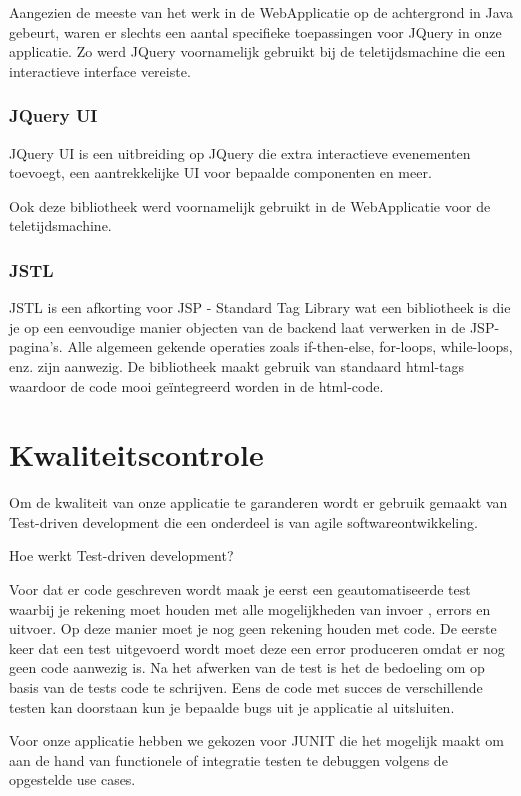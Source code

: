 \documentclass[pdftex,a4paper,12pt,twoside]{report}
\begin{document}
Aangezien de meeste van het werk in de WebApplicatie op de achtergrond in Java gebeurt, waren er slechts een aantal specifieke toepassingen voor JQuery in onze applicatie. Zo werd JQuery voornamelijk gebruikt bij de teletijdsmachine die een interactieve interface vereiste.


\subsection{JQuery UI}
JQuery UI is een uitbreiding op JQuery die extra interactieve evenementen toevoegt, een aantrekkelijke UI voor bepaalde componenten en meer.

Ook deze bibliotheek werd voornamelijk gebruikt in de WebApplicatie voor de teletijdsmachine.


\subsection{JSTL}
JSTL is een afkorting voor JSP - Standard Tag Library wat een bibliotheek is die je op een eenvoudige manier objecten van de backend laat verwerken in de JSP-pagina's. Alle algemeen gekende operaties zoals if-then-else, for-loops, while-loops, enz. zijn aanwezig. De bibliotheek maakt gebruik van standaard html-tags waardoor de code mooi geïntegreerd worden in de html-code.

 
 \chapter{Kwaliteitscontrole}
 

Om de kwaliteit van onze applicatie te garanderen wordt er gebruik gemaakt van Test-driven development die een onderdeel is van agile softwareontwikkeling.

Hoe werkt Test-driven development?

Voor dat er code geschreven wordt maak je eerst een geautomatiseerde test waarbij je rekening moet houden met alle mogelijkheden van invoer , errors en uitvoer. Op deze manier moet je nog geen rekening houden met code.
De eerste keer dat een test uitgevoerd wordt moet deze een error produceren omdat er nog geen code aanwezig is.
Na het afwerken van de test is het de bedoeling om op basis van de tests code te schrijven.
Eens de code met succes de verschillende testen kan doorstaan kun je bepaalde bugs uit je applicatie al uitsluiten.

Voor onze applicatie hebben we gekozen voor JUNIT die het mogelijk maakt om aan de hand van functionele of integratie testen te debuggen volgens de opgestelde use cases.
\end{document}
